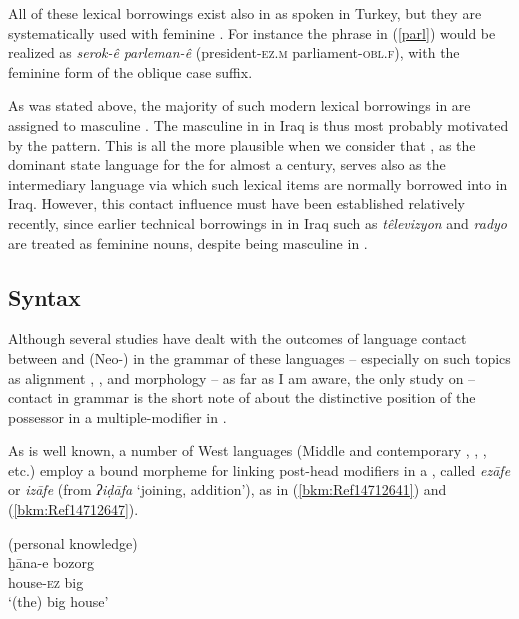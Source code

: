 \documentclass[output=paper]{langsci/langscibook}
\begin{document}
All of these lexical borrowings exist also in  as spoken in Turkey, but they are systematically used with feminine . For instance the phrase in (\ref{parl}) would be realized as \textit{serok-ê} \textit{parleman-ê} (president-\textsc{ez.m} parliament-\textsc{obl.f}), with the feminine form of the oblique case suffix. 

As was stated above, the majority of such modern lexical borrowings in  are assigned to masculine . The masculine  in  in Iraq is thus most probably motivated by the   pattern. This is all the more plausible when we consider that , as the dominant state language for the   for almost a century, serves also as the intermediary language via which such lexical items are normally borrowed into  in Iraq. However, this contact influence must have been established relatively recently, since earlier technical borrowings in  in Iraq such as \textit{têlevizyon} and \textit{radyo} are treated as feminine nouns, despite being masculine in .  

\subsection{\label{bkm:Ref520275931} Syntax}

Although several studies have dealt with the outcomes of language contact between  and (Neo-) in the grammar of these languages – especially on such topics as alignment \citep{Coghill2016},  \citep{Haig2014}, and  morphology \citep{Noorlander2014} – as far as I am aware, the only study on – contact in grammar is the short note of \citet{Tsabolov1994} about the distinctive position of the possessor in a multiple-modifier  in  . 

As is well known, a number of West  languages (Middle and contemporary , , , etc.) employ a bound morpheme for linking post-head modifiers in a , called \textit{ezāfe} or \textit{izāfe} (from  \textit{ʔiḍāfa} ‘joining, addition’), as in (\ref{bkm:Ref14712641}) and (\ref{bkm:Ref14712647}). 

\ea\label{bkm:Ref14712641} (personal knowledge)\\
\gll ḫāna-e bozorg\\
     house-\textsc{ez} big\\
\glt ‘(the) big house’
\z
\end{document}
